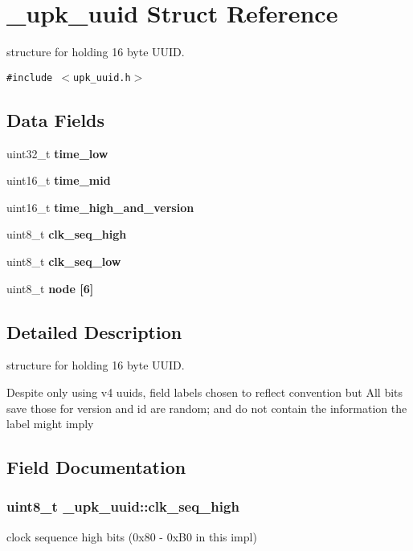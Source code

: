 \section{\_\-upk\_\-uuid Struct Reference}
\label{struct__upk__uuid}
structure for holding 16 byte UUID.  


{\tt \#include $<$upk\_\-uuid.h$>$}

\subsection*{Data Fields}
\begin{CompactItemize}
\item 
uint32\_\-t \bf{time\_\-low}
\item 
uint16\_\-t \bf{time\_\-mid}
\item 
uint16\_\-t \bf{time\_\-high\_\-and\_\-version}
\item 
uint8\_\-t \bf{clk\_\-seq\_\-high}
\item 
uint8\_\-t \bf{clk\_\-seq\_\-low}
\item 
uint8\_\-t \bf{node} [6]
\end{CompactItemize}


\subsection{Detailed Description}
structure for holding 16 byte UUID. 

Despite only using v4 uuids, field labels chosen to reflect convention but All bits save those for version and id are random; and do not contain the information the label might imply 



\subsection{Field Documentation}
\subsubsection{\setlength{\rightskip}{0pt plus 5cm}uint8\_\-t \bf{\_\-upk\_\-uuid::clk\_\-seq\_\-high}}\label{struct__upk__uuid_05dbb18becfbfe50c7cf1d6912ba96b1}


clock sequence high bits (0x80 - 0x\-B0 in this impl) 

